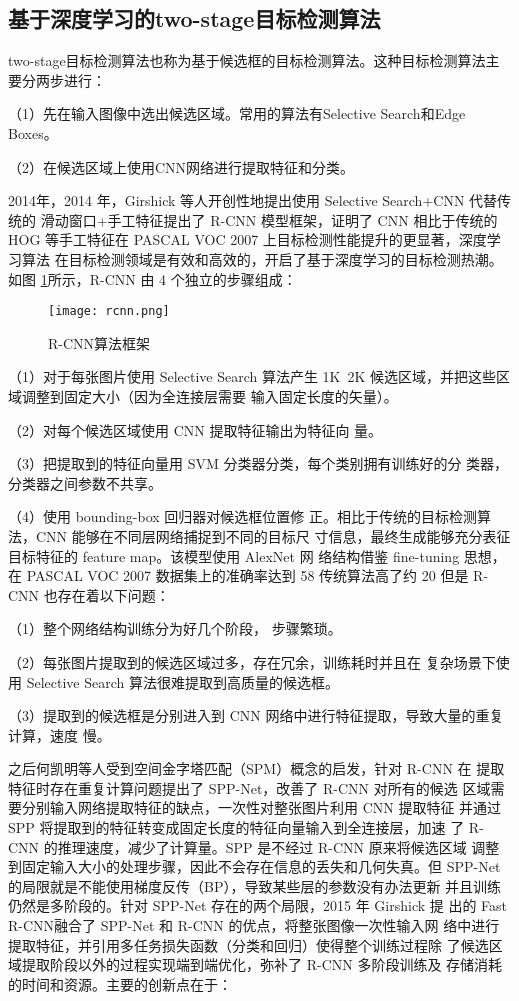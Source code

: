 \subsection{基于深度学习的two-stage目标检测算法}
two-stage目标检测算法也称为基于候选框的目标检测算法。这种目标检测算法主要分两步进行：

（1）先在输入图像中选出候选区域。常用的算法有Selective Search和Edge Boxes。

（2）在候选区域上使用CNN网络进行提取特征和分类。

2014年，2014 年，Girshick 等人开创性地提出使用 Selective Search+CNN 代替传统的
滑动窗口+手工特征提出了 R-CNN 模型框架\cite{girshick2014rich}，证明了 CNN 相比于传统的 HOG
等手工特征在 PASCAL VOC 2007 上目标检测性能提升的更显著，深度学习算法
在目标检测领域是有效和高效的，开启了基于深度学习的目标检测热潮。如图
\ref{rcnn}所示，R-CNN 由 4 个独立的步骤组成：

\begin{figure}[htbp]
    \centering
    \texttt{[image: rcnn.png]}
    \caption{R-CNN算法框架}
    \label{rcnn}
\end{figure}

（1）对于每张图片使用 Selective Search
算法产生 1K~2K 候选区域，并把这些区域调整到固定大小（因为全连接层需要
输入固定长度的矢量）。

（2）对每个候选区域使用 CNN 提取特征输出为特征向
量。

（3）把提取到的特征向量用 SVM 分类器分类，每个类别拥有训练好的分
类器，分类器之间参数不共享。

（4）使用 bounding-box 回归器对候选框位置修
正。相比于传统的目标检测算法，CNN 能够在不同层网络捕捉到不同的目标尺
寸信息，最终生成能够充分表征目标特征的 feature map。该模型使用 AlexNet 网
络结构借鉴 fine-tuning 思想，在 PASCAL VOC 2007 数据集上的准确率达到 58%
传统算法高了约 20%
但是 R-CNN 也存在着以下问题：

（1）整个网络结构训练分为好几个阶段，
步骤繁琐。

（2）每张图片提取到的候选区域过多，存在冗余，训练耗时并且在
复杂场景下使用 Selective Search 算法很难提取到高质量的候选框。

（3）提取到的候选框是分别进入到 CNN 网络中进行特征提取，导致大量的重复计算，速度
慢。

之后何凯明等人受到空间金字塔匹配（SPM）概念的启发，针对 R-CNN 在
提取特征时存在重复计算问题提出了 SPP-Net\cite{purkait2017spp}，改善了 R-CNN 对所有的候选
区域需要分别输入网络提取特征的缺点，一次性对整张图片利用 CNN 提取特征
并通过 SPP 将提取到的特征转变成固定长度的特征向量输入到全连接层，加速
了 R-CNN 的推理速度，减少了计算量。SPP 是不经过 R-CNN 原来将候选区域
调整到固定输入大小的处理步骤，因此不会存在信息的丢失和几何失真。但
SPP-Net 的局限就是不能使用梯度反传（BP），导致某些层的参数没有办法更新
并且训练仍然是多阶段的。针对 SPP-Net 存在的两个局限，2015 年 Girshick 提
出的 Fast R-CNN\cite{girshick2015fast}融合了 SPP-Net 和 R-CNN 的优点，将整张图像一次性输入网
络中进行提取特征，并引用多任务损失函数（分类和回归）使得整个训练过程除
了候选区域提取阶段以外的过程实现端到端优化，弥补了 R-CNN 多阶段训练及
存储消耗的时间和资源。主要的创新点在于：

